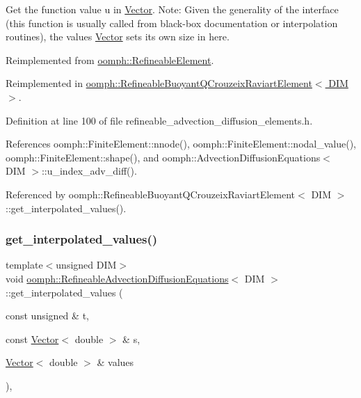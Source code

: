 Get the function value u in \hyperlink{classoomph_1_1Vector}{Vector}. Note\+: Given the generality of the interface (this function is usually called from black-\/box documentation or interpolation routines), the values \hyperlink{classoomph_1_1Vector}{Vector} sets its own size in here. 



Reimplemented from \hyperlink{classoomph_1_1RefineableElement_ad9a4f92880668a2373326d8306365c43}{oomph\+::\+Refineable\+Element}.



Reimplemented in \hyperlink{classoomph_1_1RefineableBuoyantQCrouzeixRaviartElement_aa89e116d612b3530edd2b0666d25cf01}{oomph\+::\+Refineable\+Buoyant\+Q\+Crouzeix\+Raviart\+Element$<$ D\+I\+M $>$}.



Definition at line 100 of file refineable\+\_\+advection\+\_\+diffusion\+\_\+elements.\+h.



References oomph\+::\+Finite\+Element\+::nnode(), oomph\+::\+Finite\+Element\+::nodal\+\_\+value(), oomph\+::\+Finite\+Element\+::shape(), and oomph\+::\+Advection\+Diffusion\+Equations$<$ D\+I\+M $>$\+::u\+\_\+index\+\_\+adv\+\_\+diff().



Referenced by oomph\+::\+Refineable\+Buoyant\+Q\+Crouzeix\+Raviart\+Element$<$ D\+I\+M $>$\+::get\+\_\+interpolated\+\_\+values().

\mbox{\label{classoomph_1_1RefineableAdvectionDiffusionEquations_a0a916bc1f20ff94e7feed984d41148fb}} 
\subsubsection{\texorpdfstring{get\+\_\+interpolated\+\_\+values()}{get\_interpolated\_values()}\hspace{0.1cm}{\footnotesize\ttfamily [2/2]}}
{\footnotesize\ttfamily template$<$unsigned D\+IM$>$ \\
void \hyperlink{classoomph_1_1RefineableAdvectionDiffusionEquations}{oomph\+::\+Refineable\+Advection\+Diffusion\+Equations}$<$ D\+IM $>$\+::get\+\_\+interpolated\+\_\+values (\begin{DoxyParamCaption}\item[{const unsigned \&}]{t,  }\item[{const \hyperlink{classoomph_1_1Vector}{Vector}$<$ double $>$ \&}]{s,  }\item[{\hyperlink{classoomph_1_1Vector}{Vector}$<$ double $>$ \&}]{values }\end{DoxyParamCaption})\hspace{0.3cm}{\ttfamily [inline]}, {\ttfamily [virtual]}}



